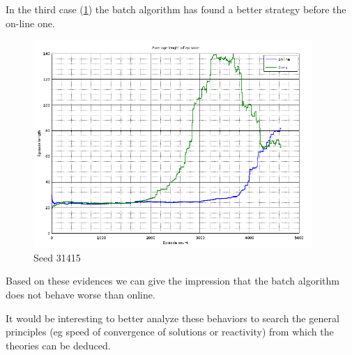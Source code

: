 \documentclass[a4paper,11pt]{article}
\begin{document}
In the third case (\ref{fig:seed31415}) the batch algorithm has found a better strategy before the on-line one.

\begin{figure}
	\label{fig:seed31415}
	\includegraphics[width=300pt]{episodes-314}
	\caption{Seed 31415}
\end{figure}

Based on these evidences we can give the impression that the batch algorithm does not behave worse than online.

It would be interesting to better analyze these behaviors to search the general principles (eg speed of convergence of solutions or reactivity) from which the theories can be deduced.
\end{document}
